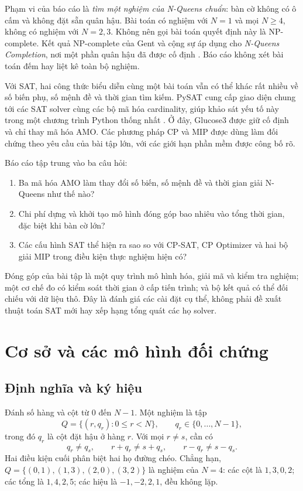 \documentclass[a4paper,fleqn]{cas-sc}
\begin{document}
Phạm vi của báo cáo là \emph{tìm một nghiệm của N-Queens chuẩn}: bàn cờ không có ô cấm và không đặt sẵn quân hậu. Bài toán có nghiệm với $N=1$ và mọi $N\geq4$, không có nghiệm với $N=2,3$. Không nên gọi bài toán quyết định này là NP-complete. Kết quả NP-complete của Gent và cộng sự áp dụng cho \emph{N-Queens Completion}, nơi một phần quân hậu đã được cố định \citep{gent2017}. Báo cáo không xét bài toán đếm hay liệt kê toàn bộ nghiệm.

Với SAT, hai công thức biểu diễn cùng một bài toán vẫn có thể khác rất nhiều về số biến phụ, số mệnh đề và thời gian tìm kiếm. PySAT cung cấp giao diện chung tới các SAT solver cùng các bộ mã hóa cardinality, giúp khảo sát yếu tố này trong một chương trình Python thống nhất \citep{pysat2018}. Ở đây, Glucose3 được giữ cố định và chỉ thay mã hóa AMO. Các phương pháp CP và MIP được dùng làm đối chứng theo yêu cầu của bài tập lớn, với các giới hạn phần mềm được công bố rõ.

Báo cáo tập trung vào ba câu hỏi:
\begin{enumerate}
\item Ba mã hóa AMO làm thay đổi số biến, số mệnh đề và thời gian giải N-Queens như thế nào?
\item Chi phí dựng và khởi tạo mô hình đóng góp bao nhiêu vào tổng thời gian, đặc biệt khi bàn cờ lớn?
\item Các cấu hình SAT thể hiện ra sao so với CP-SAT, CP Optimizer và hai bộ giải MIP trong điều kiện thực nghiệm hiện có?
\end{enumerate}
Đóng góp của bài tập là một quy trình mô hình hóa, giải mã và kiểm tra nghiệm; một cơ chế đo có kiểm soát thời gian ở cấp tiến trình; và bộ kết quả có thể đối chiếu với dữ liệu thô. Đây là đánh giá các cài đặt cụ thể, không phải đề xuất thuật toán SAT mới hay xếp hạng tổng quát các họ solver.

\section{Cơ sở và các mô hình đối chứng}\label{sec:background}
\subsection{Định nghĩa và ký hiệu}
Đánh số hàng và cột từ $0$ đến $N-1$. Một nghiệm là tập
\begin{equation}
 Q=\{(r,q_r):0\leq r<N\},\qquad q_r\in\{0,\ldots,N-1\},
\end{equation}
trong đó $q_r$ là cột đặt hậu ở hàng $r$. Với mọi $r\ne s$, cần có
\begin{equation}\label{eq:valid}
 q_r\ne q_s,\qquad r+q_r\ne s+q_s,\qquad r-q_r\ne s-q_s.
\end{equation}
Hai điều kiện cuối phân biệt hai họ đường chéo. Chẳng hạn, $Q=\{(0,1),(1,3),(2,0),(3,2)\}$ là nghiệm của $N=4$: các cột là $1,3,0,2$; các tổng là $1,4,2,5$; các hiệu là $-1,-2,2,1$, đều không lặp.
\end{document}
